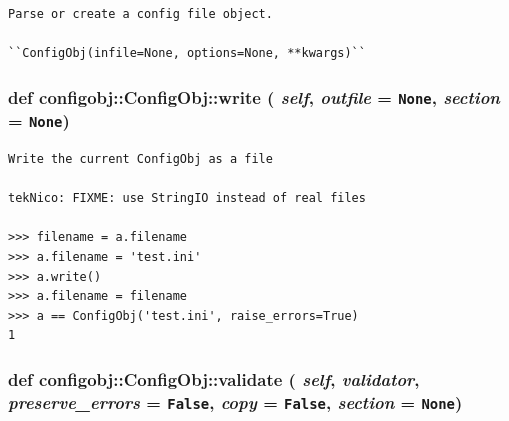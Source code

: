 \footnotesize\begin{verbatim}
Parse or create a config file object.

``ConfigObj(infile=None, options=None, **kwargs)``
\end{verbatim}
\normalsize
\subsubsection{\setlength{\rightskip}{0pt plus 5cm}def configobj::Config\-Obj::write ( {\em self},  {\em outfile} = {\tt None},  {\em section} = {\tt None})}\label{classconfigobj_1_1ConfigObj_60722dd8c38412b05cab80755298187d}




\footnotesize\begin{verbatim}
Write the current ConfigObj as a file

tekNico: FIXME: use StringIO instead of real files

>>> filename = a.filename
>>> a.filename = 'test.ini'
>>> a.write()
>>> a.filename = filename
>>> a == ConfigObj('test.ini', raise_errors=True)
1
\end{verbatim}
\normalsize
\subsubsection{\setlength{\rightskip}{0pt plus 5cm}def configobj::Config\-Obj::validate ( {\em self},  {\em validator},  {\em preserve\_\-errors} = {\tt False},  {\em copy} = {\tt False},  {\em section} = {\tt None})}\label{classconfigobj_1_1ConfigObj_c5c1180a0065104014f50d37a7d0852c}




